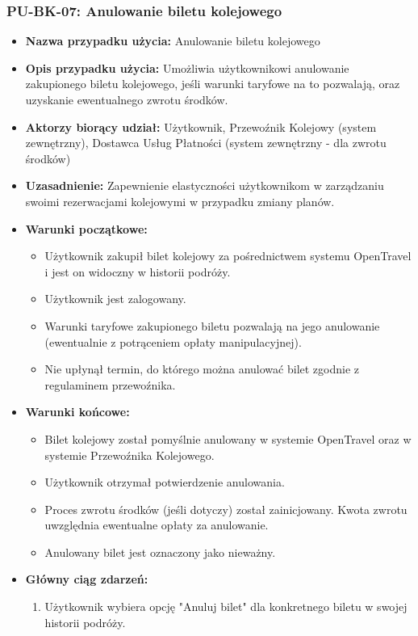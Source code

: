 \documentclass[a4paper,12pt]{article}
\begin{document}
\subsubsection{PU-BK-07: Anulowanie biletu kolejowego}
\begin{itemize}
\item \textbf{Nazwa przypadku użycia:} Anulowanie biletu kolejowego
\item \textbf{Opis przypadku użycia:} Umożliwia użytkownikowi anulowanie zakupionego biletu kolejowego, jeśli warunki taryfowe na to pozwalają, oraz uzyskanie ewentualnego zwrotu środków.
\item \textbf{Aktorzy biorący udział:} Użytkownik, Przewoźnik Kolejowy (system zewnętrzny), Dostawca Usług Płatności (system zewnętrzny - dla zwrotu środków)
\item \textbf{Uzasadnienie:} Zapewnienie elastyczności użytkownikom w zarządzaniu swoimi rezerwacjami kolejowymi w przypadku zmiany planów.
\item \textbf{Warunki początkowe:}
\begin{itemize}
\item Użytkownik zakupił bilet kolejowy za pośrednictwem systemu OpenTravel i jest on widoczny w historii podróży.
\item Użytkownik jest zalogowany.
\item Warunki taryfowe zakupionego biletu pozwalają na jego anulowanie (ewentualnie z potrąceniem opłaty manipulacyjnej).
\item Nie upłynął termin, do którego można anulować bilet zgodnie z regulaminem przewoźnika.
\end{itemize}
\item \textbf{Warunki końcowe:}
\begin{itemize}
\item Bilet kolejowy został pomyślnie anulowany w systemie OpenTravel oraz w systemie Przewoźnika Kolejowego.
\item Użytkownik otrzymał potwierdzenie anulowania.
\item Proces zwrotu środków (jeśli dotyczy) został zainicjowany. Kwota zwrotu uwzględnia ewentualne opłaty za anulowanie.
\item Anulowany bilet jest oznaczony jako nieważny.
\end{itemize}
\item \textbf{Główny ciąg zdarzeń:}
\begin{enumerate}
\item Użytkownik wybiera opcję "Anuluj bilet" dla konkretnego biletu w swojej historii podróży.

\end{enumerate}
\end{itemize}
\end{document}
